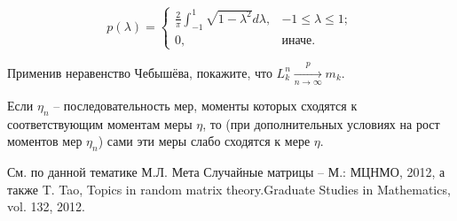 \begin{problem}
\[p(\lambda )=\left\{\begin{array}{cc} {\frac{2}{\pi } \int _{-1}^{1}\sqrt{1-\lambda ^{2} } d\lambda , } & {-1\le \lambda \le 1;} \\ {0,} & {\text{иначе.}} \end{array}\right. \] 

\noindent Применив неравенство Чебышёва, покажите, что $L_{k}^{n} \mathop{\to }\limits_{n\to \infty }^{p} m_{k} .$


\end{problem}



\begin{remark}
Если $\eta_{n} $ -- последовательность мер, моменты которых сходятся к соответствующим моментам меры $\eta $, то (при дополнительных условиях на рост моментов мер $\eta_{n} $) сами эти меры слабо сходятся к мере $\eta $.

См. по данной тематике М.Л. Мета Случайные матрицы -- М.:  МЦНМО, 2012, а также T. Tao, Topics in random matrix theory.Graduate Studies in Mathematics, vol. 132, 2012. 
\end{remark}



